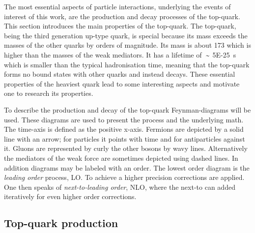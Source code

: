 The most essential aspects of particle interactions, underlying the events of interest of this work, are the production and decay processes of the top-quark. This section introduces the main properties of the top-quark. 
The top-quark, being the third generation up-type quark, is special because its mass exceeds the masses of the other quarks by orders of magnitude. Its mass is about \SI{173}{\GeVovercsq} which is higher than the masses of the weak mediators. 
It has a lifetime of~$\sim\!$~\SI{5E-25}{\second} which is smaller than the typical hadronisation time, meaning that the top-quark forms no bound states with other quarks and instead decays.
These essential properties of the heaviest quark lead to some interesting aspects and motivate one to research its properties.

To describe the production and decay of the top-quark Feynman-diagrams will be used. These diagrams are used to present the process and the underlying math. The time-axis is defined as the positive x-axis. Fermions are depicted by a solid line with an arrow; for particles it points with time and for antiparticles against it. Gluons are represented by curly the other bosons by wavy lines. Alternatively the mediators of the weak force are sometimes depicted using dashed lines.
In addition diagrams may be labeled with an order. The lowest order diagram is the \emph{leading order} process, LO. To achieve a higher precision corrections are applied. One then speaks of \emph{next-to-leading order}, NLO, where the next-to can added iteratively for even higher order corrections.


\subsection{Top-quark production}

